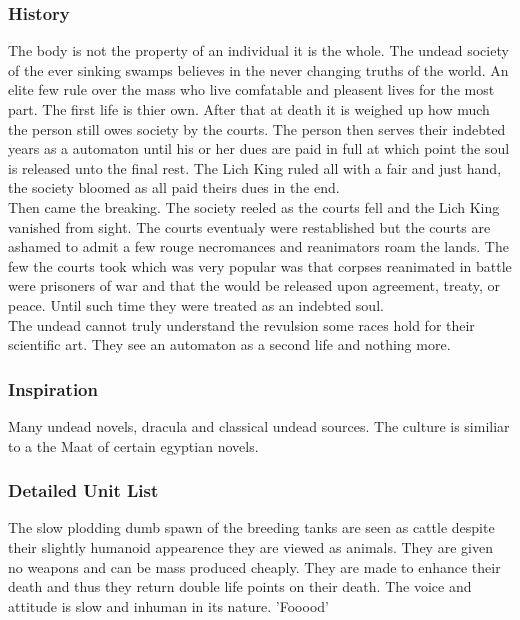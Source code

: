 \documentclass[a4paper,twocolumn]{article}
\begin{document}
\subsubsection{History}

The body is not the property of an individual it is the whole. The undead society of the ever sinking swamps believes in the never changing truths of the world. An elite few rule over the mass who live comfatable and pleasent lives for the most part. The first life is thier own. After that at death it is weighed up how much the person still owes society by the courts. The person then serves their indebted years as a automaton until his or her dues are paid in full at which point the soul is released unto the final rest. The Lich King ruled all with a fair and just hand, the society bloomed as all paid theirs dues in the end.\\
Then came the breaking. The society reeled as the courts fell and the Lich King vanished from sight. The courts eventualy were restablished but the courts are ashamed to admit a few rouge necromances and reanimators roam the lands. The few the courts took which was very popular was that corpses reanimated in battle were prisoners of war and that the would be released upon agreement, treaty, or peace. Until such time they were treated as an indebted soul.\\
The undead cannot truly understand the revulsion some races hold for their scientific art. They see an automaton as a second life and nothing more.

\subsubsection{Inspiration}

Many undead novels, dracula and classical undead sources. The culture is similiar to a the Maat of certain egyptian novels. 

\subsubsection{Detailed Unit List}

The slow plodding dumb spawn of the breeding tanks are seen as cattle despite their slightly humanoid appearence they are viewed as animals. They are given no weapons and can be mass produced cheaply. They are made to enhance their death and thus they return double life points on their death. The voice and attitude is slow and inhuman in its nature. 'Fooood'
\end{document}
